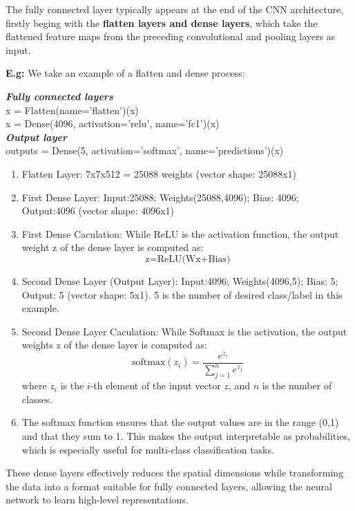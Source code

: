 \documentclass[12pt]{article}
\begin{document}
\begin{enumerate}
        The fully connected layer typically appears at the end of the CNN architecture, firstly beging with the \textbf{flatten layers and dense layers}, which take the flattened feature maps from the preceding convolutional and pooling layers as input. 

        \textbf{E.g:} We take an example of a flatten and dense process:
        
        \textit{\textbf{Fully connected layers}}
        \\ x = Flatten(name='flatten')(x)
        \\ x = Dense(4096, activation='relu', name='fc1')(x)
        \\\textit{\textbf{Output layer}}
        \\outputs = Dense(5, activation='softmax', name='predictions')(x)
        
        \begin{enumerate}
            \item Flatten Layer: 7x7x512 = 25088 weights (vector shape: 25088x1)
            \item First Dense Layer: Input:25088; Weights(25088,4096); Bias: 4096; Output:4096 (vector shape: 4096x1)
            \item First Dense Caculation: While ReLU is the activation function, the output weight z of the dense layer is computed as:
            \[\text{z} = \text{ReLU(Wx+Bias)}\]
            \item Second Dense Layer (Output Layer): Input:4096; Weights(4096,5); Bias: 5; Output: 5 (vector shape: 5x1). 5 is the number of desired class/label in this example.
            \item Second Dense Layer Caculation: While Softmax is the activation, the output weights z of the dense layer is computed as:
            \[\text{softmax}(z_i) = \frac{e^{z_i}}{\sum_{j=1}^{n} e^{z_j}}\]
            where \( z_i \) is the \( i \)-th element of the input vector \( z \), and \( n \) is the number of classes.
            \item The softmax function ensures that the output values are in the range (0,1) and that they sum to 1. This makes the output interpretable as probabilities, which is especially useful for multi-class classification tasks.
        \end{enumerate}

        These dense layers effectively reduces the spatial dimensions while transforming the data into a format suitable for fully connected layers, allowing the neural network to learn high-level representations.
    \end{enumerate}
	
\end{document}
